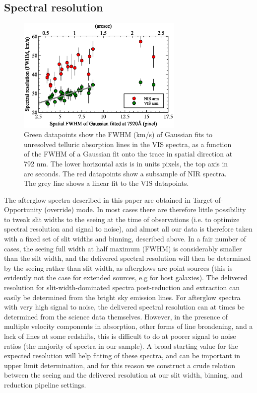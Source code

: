 \documentclass{aa}    %
\begin{document}
\subsection{Spectral resolution} \label{resolution}


\begin{figure}[!ht]
	\centerline{\includegraphics[width=8cm]{figures/resolution_paper.eps}}
	\caption{Green datapoints show the FWHM (km/s) of Gaussian fits to unresolved telluric absorption lines in the VIS spectra, as a function of the FWHM of a Gaussian fit onto the trace in spatial direction at  792 nm. The lower horizontal axis is in units pixels, the top axis in arc seconds. The red datapoints show a subsample of NIR spectra.
		The grey line shows a linear fit to the VIS datapoints. }
	\label{fig:res}
\end{figure}


The afterglow spectra described in this paper are obtained in
Target-of-Opportunity (override) mode. In most cases there are therefore little
possibility to tweak slit widths to the seeing at the time of observations (i.e.
to optimize spectral resolution and signal to noise), and almost all our data is
therefore taken with a fixed set of slit widths and binning, described above. In
a fair number of cases, the seeing full width at half maximum (FWHM) is
considerably smaller than the silt width, and the delivered spectral resolution
will then be determined by the seeing rather than slit width, as afterglows are
point sources (this is evidently not the case for extended sources, e.g for host
galaxies). The delivered resolution for slit-width-dominated spectra
post-reduction and extraction can easily be determined from the bright sky
emission lines. For afterglow spectra with very high signal to noise, the
delivered spectral resolution can at times be determined from the science data
themselves. However, in the presence of multiple velocity components in
absorption, other forms of line broadening, and a lack of lines at some
redshifts, this is difficult to do at poorer signal to noise ratios (the
majority of spectra in our sample). A broad starting value for the expected
resolution will help fitting of these spectra, and can be important in upper
limit determination, and for this reason we construct a crude relation between
the seeing and the delivered resolution at our slit width, binning, and
reduction pipeline settings. 
\end{document}
